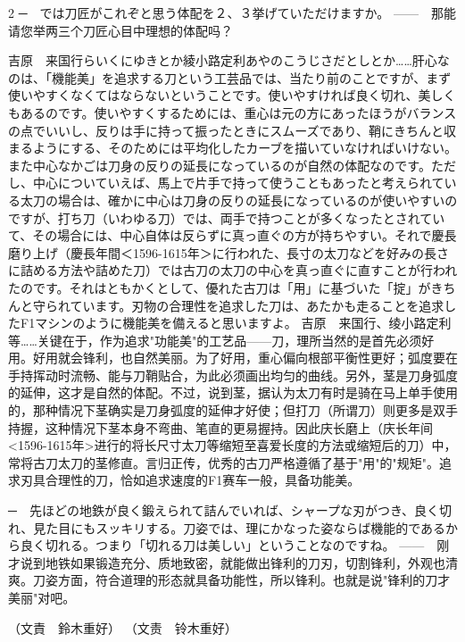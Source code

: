 \documentclass[12pt,UTF8]{ctexbook}
\begin{document}
\begin{paracol}{2}
─　では刀匠がこれぞと思う体配を２、３挙げていただけますか。
\switchcolumn*
——　那能请您举两三个刀匠心目中理想的体配吗？
\switchcolumn*

吉原　来国行らいくにゆきとか綾小路定利あやのこうじさだとしとか……肝心なのは、「機能美」を追求する刀という工芸品では、当たり前のことですが、まず使いやすくなくてはならないということです。使いやすければ良く切れ、美しくもあるのです。使いやすくするためには、重心は元の方にあったほうがバランスの点でいいし、反りは手に持って振ったときにスムーズであり、鞘にきちんと収まるようにする、そのためには平均化したカーブを描いていなければいけない。また中心なかごは刀身の反りの延長になっているのが自然の体配なのです。ただし、中心についていえば、馬上で片手で持って使うこともあったと考えられている太刀の場合は、確かに中心は刀身の反りの延長になっているのが使いやすいのですが、打ち刀（いわゆる刀）では、両手で持つことが多くなったとされていて、その場合には、中心自体は反らずに真っ直ぐの方が持ちやすい。それで慶長磨り上げ（慶長年間＜1596-1615年＞に行われた、長寸の太刀などを好みの長さに詰める方法や詰めた刀）では古刀の太刀の中心を真っ直ぐに直すことが行われたのです。それはともかくとして、優れた古刀は「用」に基づいた「掟」がきちんと守られています。刃物の合理性を追求した刀は、あたかも走ることを追求したF1マシンのように機能美を備えると思いますよ。
\switchcolumn*
吉原　来国行、绫小路定利等……关键在于，作为追求"功能美"的工艺品——刀，理所当然的是首先必须好用。好用就会锋利，也自然美丽。为了好用，重心偏向根部平衡性更好；弧度要在手持挥动时流畅、能与刀鞘贴合，为此必须画出均匀的曲线。另外，茎是刀身弧度的延伸，这才是自然的体配。不过，说到茎，据认为太刀有时是骑在马上单手使用的，那种情况下茎确实是刀身弧度的延伸才好使；但打刀（所谓刀）则更多是双手持握，这种情况下茎本身不弯曲、笔直的更易握持。因此庆长磨上（庆长年间<1596-1615年>进行的将长尺寸太刀等缩短至喜爱长度的方法或缩短后的刀）中，常将古刀太刀的茎修直。言归正传，优秀的古刀严格遵循了基于"用"的"规矩"。追求刃具合理性的刀，恰如追求速度的F1赛车一般，具备功能美。
\switchcolumn*

─　先ほどの地鉄が良く鍛えられて詰んでいれば、シャープな刃がつき、良く切れ、見た目にもスッキリする。刀姿では、理にかなった姿ならば機能的であるから良く切れる。つまり「切れる刀は美しい」ということなのですね。
\switchcolumn*
——　刚才说到地铁如果锻造充分、质地致密，就能做出锋利的刀刃，切割锋利，外观也清爽。刀姿方面，符合道理的形态就具备功能性，所以锋利。也就是说"锋利的刀才美丽"对吧。
\switchcolumn*

（文責　鈴木重好）
\switchcolumn*
（文责　铃木重好）
\end{paracol}
\end{document}
